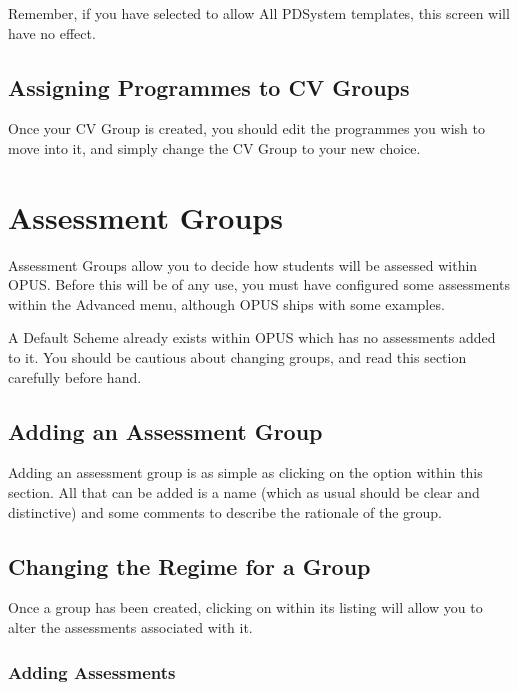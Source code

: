 \documentclass[12 pt]{book}
\begin{document}
Remember, if you have selected to allow All PDSystem templates, this screen
will have no effect.

\subsection{Assigning Programmes to CV Groups}

Once your CV Group is created, you should edit the programmes you wish to move
into it, and simply change the CV Group to your new choice.

\section{Assessment Groups}

Assessment Groups allow you to decide how students will be assessed within
OPUS. Before this will be of any use, you must have configured some assessments
within the Advanced menu, although OPUS ships with some examples.

A Default Scheme already exists within OPUS which has no assessments added to
it. You should be cautious about changing groups, and read this section
carefully before hand.

\subsection{Adding an Assessment Group}

Adding an assessment group is as simple as clicking on the  option
within this section. All that can be added is a name (which as usual should be
clear and distinctive) and some comments to describe the rationale of the
group.

\subsection{Changing the Regime for a Group}

Once a group has been created, clicking on  within its listing
will allow you to alter the assessments associated with it.


\subsubsection{Adding Assessments}
\end{document}
